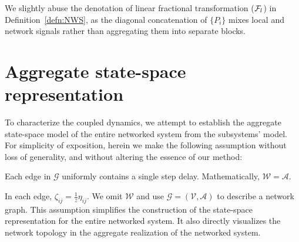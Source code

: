 \begin{rem}
We slightly abuse the denotation of linear fractional transformation (\({\mathcal{F}_l}\)) in Definition~\ref{defn:NWS}, as the diagonal concatenation of \(\{P_i\}\) mixes 
local and network signals rather than aggregating them into separate blocks.
\end{rem}


    


\section{Aggregate state-space representation}
To characterize the coupled dynamics, we attempt to establish the aggregate state-space model of the entire networked system from the subsystems' model.
For simplicity of exposition, herein we make the following assumption without loss of generality, and without altering the essence of our method:
\begin{assumption}
Each edge in \(\mathcal{G}\) uniformly contains a single step delay. Mathematically, 
\(\mathcal{W} =\mathcal{A}\).
\end{assumption}
In each edge, \(\zeta_{ij} = \frac{1}{z} \eta_{ij}\). We omit \(\mathcal{W}\) and use \(\mathcal{G}= (\mathcal{V}, \mathcal{A})\) to describe a network graph. This assumption simplifies the construction of the state-space representation for the entire networked system. It also directly visualizes the network topology in the aggregate realization of the networked system.



